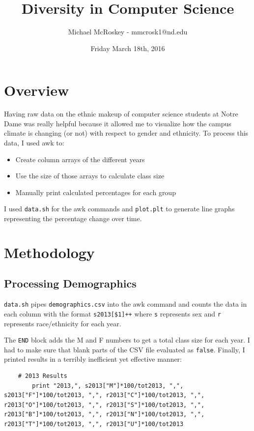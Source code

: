 \documentclass[letterpaper]{article}
\title{Diversity in Computer Science}
\date{Friday March 18th, 2016}
\author{Michael McRoskey - mmcrosk1@nd.edu}
\begin{document}
\maketitle
\section*{Overview}

Having raw data on the ethnic makeup of computer science students at Notre Dame was really helpful because it allowed me to visualize how the campus climate is changing (or not) with respect to gender and ethnicity. To process this data, I used awk to:

\begin{itemize}
	\item Create column arrays of the different years
	\item Use the size of those arrays to calculate class size
	\item Manually print calculated percentages for each group
\end{itemize}

I used {\tt data.sh} for the awk commands and {\tt plot.plt} to generate line graphs representing the percentage change over time.

\section*{Methodology}

\subsection*{Processing Demographics}

{\tt data.sh} pipes {\tt demographics.csv} into the awk command and counts the data in each column with the format {\tt s2013[\$1]++} where {\tt s} represents sex and {\tt r} represents race/ethnicity for each year. 

The {\tt END} block adds the M and F numbers to get a total class size for each year. I had to make sure that blank parts of the CSV file evaluated as {\tt false}. Finally, I printed results in a terribly inefficient yet effective manner:
 
	\begin{verbatim}
	# 2013 Results
		print "2013,", s2013["M"]*100/tot2013, ",", s2013["F"]*100/tot2013, ",", r2013["C"]*100/tot2013, ",", r2013["O"]*100/tot2013, ",", r2013["S"]*100/tot2013, ",", r2013["B"]*100/tot2013, ",", r2013["N"]*100/tot2013, ",", r2013["T"]*100/tot2013, ",", r2013["U"]*100/tot2013
	\end{verbatim}
\end{document}

